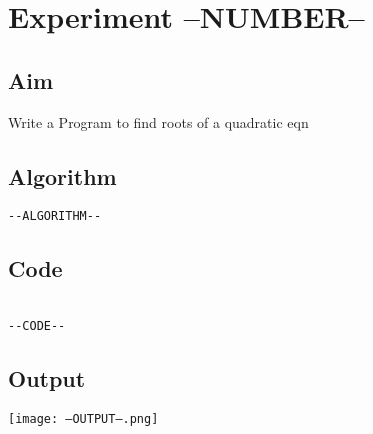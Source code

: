 \section*{Experiment --NUMBER-- }


\vspace{20px}
\subsection{Aim}
Write a Program to find roots of a quadratic eqn
\subsection{Algorithm}
\begin{verbatim}
--ALGORITHM--
\end{verbatim}
\newpage

\subsection{Code}
\begin{lstlisting}[label={list:first}]

--CODE--

\end{lstlisting}
\subsection{Output}
\texttt{[image: --OUTPUT--.png]}

\newpage
